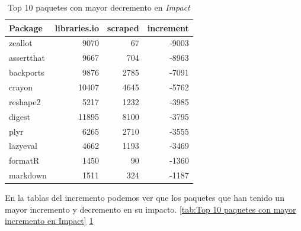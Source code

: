 \begin{table}[h!]
    \begin{center}
        \begin{tabular}{|l|r|r|r|}
            \hline
            \textbf{Package} & \textbf{libraries.io} & \textbf{scraped} & \textbf{increment} \\
            \hline
            zeallot          & 9070                  & 67               & -9003              \\
            assertthat       & 9667                  & 704              & -8963              \\
            backports        & 9876                  & 2785             & -7091              \\
            crayon           & 10407                 & 4645             & -5762              \\
            reshape2         & 5217                  & 1232             & -3985              \\
            digest           & 11895                 & 8100             & -3795              \\
            plyr             & 6265                  & 2710             & -3555              \\
            lazyeval         & 4662                  & 1193             & -3469              \\
            formatR          & 1450                  & 90               & -1360              \\
            markdown         & 1511                  & 324              & -1187              \\
            \hline
        \end{tabular}
    \end{center}
    \caption{Top 10 paquetes con mayor decremento en \textit{Impact}}
    \label{tab:Top 10 paquetes con mayor decremento en Impact}
\end{table}


En la tablas del incremento podemos ver que los paquetes que han tenido un mayor incremento y decremento
en su impacto. \ref{tab:Top 10 paquetes con mayor incremento en Impact} \ref{tab:Top 10 paquetes con mayor decremento en Impact}



